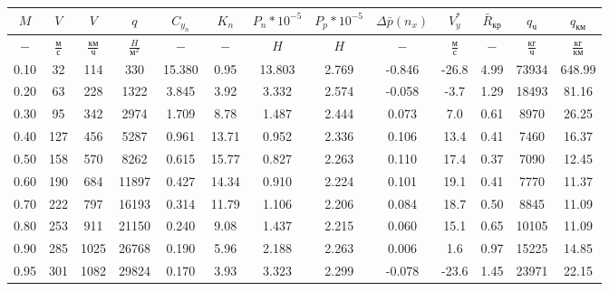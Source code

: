 \begin{tabular}{|c|c|c|c|c|c|c|c|c|c|c|c|c|}
\hline
$M$ & $V$ & $V$ & $q$ & $C_{y_n}$ & $K_n$ & $P_n*10^{-5}$ & $P_p*10^{-5}$ & $\Delta \bar{p}(n_x)$ & $V_y^*$ & $\bar{R}_{кр}$ & $q_{ч}$ & $q_{км}$ \\ 
\hline
$-$ & $\frac{м}{с}$ & $\frac{км}{ч}$ & $\frac{H}{м^2}$ & $-$ & $-$ & $H$ & $H$ & $-$ & $\frac{м}{с}$ & $-$ & $\frac{кг}{ч}$ & $\frac{кг}{км}$ \\ 
\hline
0.10 & 32 & 114 & 330 & 15.380 & 0.95 & 13.803 & 2.769 & -0.846 & -26.8 & 4.99 & 73934 & 648.99 \\ 
\hline
0.20 & 63 & 228 & 1322 & 3.845 & 3.92 & 3.332 & 2.574 & -0.058 & -3.7 & 1.29 & 18493 & 81.16 \\ 
\hline
0.30 & 95 & 342 & 2974 & 1.709 & 8.78 & 1.487 & 2.444 & 0.073 & 7.0 & 0.61 & 8970 & 26.25 \\ 
\hline
0.40 & 127 & 456 & 5287 & 0.961 & 13.71 & 0.952 & 2.336 & 0.106 & 13.4 & 0.41 & 7460 & 16.37 \\ 
\hline
0.50 & 158 & 570 & 8262 & 0.615 & 15.77 & 0.827 & 2.263 & 0.110 & 17.4 & 0.37 & 7090 & 12.45 \\ 
\hline
0.60 & 190 & 684 & 11897 & 0.427 & 14.34 & 0.910 & 2.224 & 0.101 & 19.1 & 0.41 & 7770 & 11.37 \\ 
\hline
0.70 & 222 & 797 & 16193 & 0.314 & 11.79 & 1.106 & 2.206 & 0.084 & 18.7 & 0.50 & 8845 & 11.09 \\ 
\hline
0.80 & 253 & 911 & 21150 & 0.240 & 9.08 & 1.437 & 2.215 & 0.060 & 15.1 & 0.65 & 10105 & 11.09 \\ 
\hline
0.90 & 285 & 1025 & 26768 & 0.190 & 5.96 & 2.188 & 2.263 & 0.006 & 1.6 & 0.97 & 15225 & 14.85 \\ 
\hline
0.95 & 301 & 1082 & 29824 & 0.170 & 3.93 & 3.323 & 2.299 & -0.078 & -23.6 & 1.45 & 23971 & 22.15 \\ 
\hline
\end{tabular}